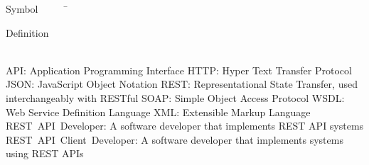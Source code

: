 

\begin{tabbing}
Symbol~~~~~\= \ \ \ \ \ \ \ \ \ \ \ \ \ \ \ \ \ \ \ \ \ \ \ \ \ \ \ \ \ \ \ \ \ \ \ \  \parbox{5in}{Definition}\\

\addsymbol \mbox{API}: {Application Programming Interface}
\addsymbol \mbox{HTTP}: {Hyper Text Transfer Protocol}
\addsymbol \mbox{JSON}: {JavaScript Object Notation}
\addsymbol \mbox{REST}: {Representational State Transfer, used interchangeably with RESTful}
\addsymbol \mbox{SOAP}: {Simple Object Access Protocol}
\addsymbol \mbox{WSDL}: {Web Service Definition Language}
\addsymbol \mbox{XML}: {Extensible Markup Language}
\addsymbol \mbox{REST API Developer}: {A software developer that implements REST API systems}
\addsymbol \mbox{REST API Client Developer}: {A software developer that implements systems using REST APIs}





\end{tabbing}
